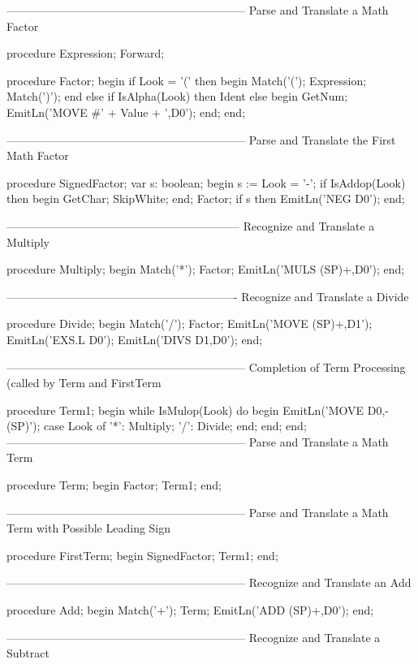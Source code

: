 \documentclass[float=false, crop=false]{standalone}
\begin{document}
\begin{code}
{---------------------------------------------------------------}
{ Parse and Translate a Math Factor }

procedure Expression; Forward;

procedure Factor;
begin
   if Look = '(' then begin
      Match('(');
      Expression;
      Match(')');
      end
   else if IsAlpha(Look) then
      Ident
   else begin
      GetNum;
      EmitLn('MOVE #' + Value + ',D0');
   end;
end;


{---------------------------------------------------------------}
{ Parse and Translate the First Math Factor }

procedure SignedFactor;
var s: boolean;
begin
   s := Look = '-';
   if IsAddop(Look) then begin
      GetChar;
      SkipWhite;
   end;
   Factor;
   if s then
      EmitLn('NEG D0');
end;


{--------------------------------------------------------------}
{ Recognize and Translate a Multiply }

procedure Multiply;
begin
   Match('*');
   Factor;
   EmitLn('MULS (SP)+,D0');
end;


{-------------------------------------------------------------}
{ Recognize and Translate a Divide }

procedure Divide;
begin
   Match('/');
   Factor;
   EmitLn('MOVE (SP)+,D1');
   EmitLn('EXS.L D0');
   EmitLn('DIVS D1,D0');
end;


{---------------------------------------------------------------}
{ Completion of Term Processing  (called by Term and FirstTerm }

procedure Term1;
begin
   while IsMulop(Look) do begin
      EmitLn('MOVE D0,-(SP)');
      case Look of
       '*': Multiply;
       '/': Divide;
      end;
   end;
end;
{---------------------------------------------------------------}
{ Parse and Translate a Math Term }

procedure Term;
begin
   Factor;
   Term1;
end;


{---------------------------------------------------------------}
{ Parse and Translate a Math Term with Possible Leading Sign }

procedure FirstTerm;
begin
   SignedFactor;
   Term1;
end;


{---------------------------------------------------------------}
{ Recognize and Translate an Add }

procedure Add;
begin
   Match('+');
   Term;
   EmitLn('ADD (SP)+,D0');
end;


{---------------------------------------------------------------}
{ Recognize and Translate a Subtract }


\end{code}
\end{document}
